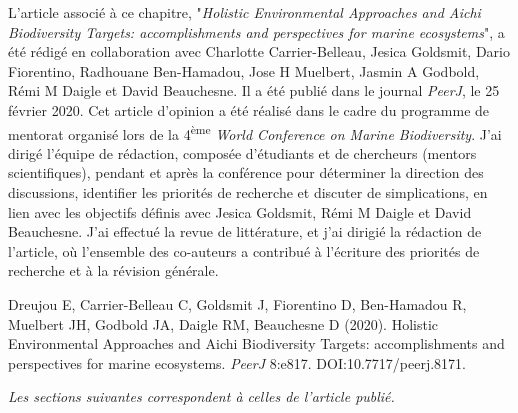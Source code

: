 L'article associé à ce chapitre, "\textit{Holistic Environmental Approaches and Aichi Biodiversity Targets: accomplishments and perspectives for marine ecosystems}", a été rédigé en collaboration avec Charlotte Carrier-Belleau, Jesica Goldsmit, Dario Fiorentino, Radhouane Ben-Hamadou, Jose H Muelbert, Jasmin A Godbold, Rémi M Daigle et David Beauchesne. Il a été publié dans le journal \textit{PeerJ}, le 25 février 2020. Cet article d'opinion a été réalisé dans le cadre du programme de mentorat organisé lors de la 4\textsuperscript{ème} \textit{World Conference on Marine Biodiversity}. J'ai dirigé l'équipe de rédaction, composée d'étudiants et de chercheurs (mentors scientifiques), pendant et après la conférence pour déterminer la direction des discussions, identifier les priorités de recherche et discuter de simplications, en lien avec les objectifs définis avec Jesica Goldsmit, Rémi M Daigle et David Beauchesne. J'ai effectué la revue de littérature, et j'ai dirigié la rédaction de l'article, où l'ensemble des co-auteurs a contribué à l'écriture des priorités de recherche et à la révision générale.
\linebreak[4]

\begin{singlespace}
Dreujou E, Carrier-Belleau C, Goldsmit J, Fiorentino D, Ben-Hamadou R, Muelbert JH, Godbold JA, Daigle RM, Beauchesne D (2020). Holistic Environmental Approaches and Aichi Biodiversity Targets: accomplishments and perspectives for marine ecosystems. \textit{PeerJ} 8:e817. DOI:10.7717/peerj.8171.
\end{singlespace}

\textit{Les sections suivantes correspondent à celles de l'article publié.}
